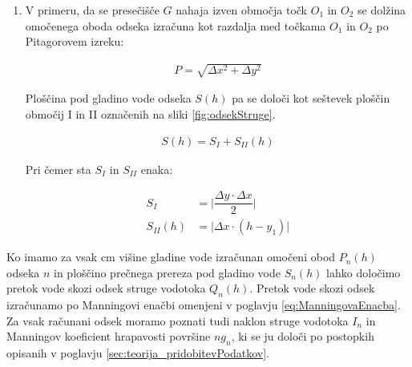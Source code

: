 \begin{enumerate}
\begin{enumerate}
	
	\item V primeru, da se presečišče $G$ nahaja izven območja točk $O_1$ in $O_2$ se dolžina omočenega oboda odseka izračuna kot razdalja med točkama $O_1$ in $O_2$ po Pitagorovem izreku:
	
	\begin{ceqn}
		\begin{align}
		P = \sqrt{ \Delta x^{2} + \Delta y^{2}}
		\end{align}
	\end{ceqn}
	
	Ploščina pod gladino vode odseka $S(h)$ pa se določi kot seštevek ploščin območij I in II označenih na sliki \ref{fig:odsekStruge}.
	
	\begin{ceqn}
		\begin{align}
		S(h) = S_I + S_{II}(h)
		\end{align}
	\end{ceqn}
	
	Pri čemer sta $S_I$ in $S_{II}$ enaka:
	
		\begin{ceqn}
			\begin{align}
			S_I&= \bigg|\dfrac{ \Delta y \cdot  \Delta x}{2}\bigg|\\
			S_{II}(h)&= \bigg|\Delta x \cdot (h - y_1)\bigg|
			\end{align}
		\end{ceqn}
		
			
		
	\end{enumerate}
	
	





\end{enumerate}









Ko imamo za vsak cm višine gladine vode izračunan omočeni obod $P_n(h)$ odseka $n$ in ploščino prečnega prereza pod gladino vode $S_n(h)$ lahko določimo pretok vode skozi odsek struge vodotoka $Q_n(h)$. Pretok vode skozi odsek izračunamo po Manningovi enačbi omenjeni v poglavju \ref{eq:ManningovaEnacba}. Za vsak računani odsek moramo poznati tudi naklon struge vodotoka $I_n$ in  Manningov koeficient hrapavosti površine $ng_n$, ki se ju določi po postopkih opisanih v poglavju \ref{sec:teorija_pridobitevPodatkov}.



